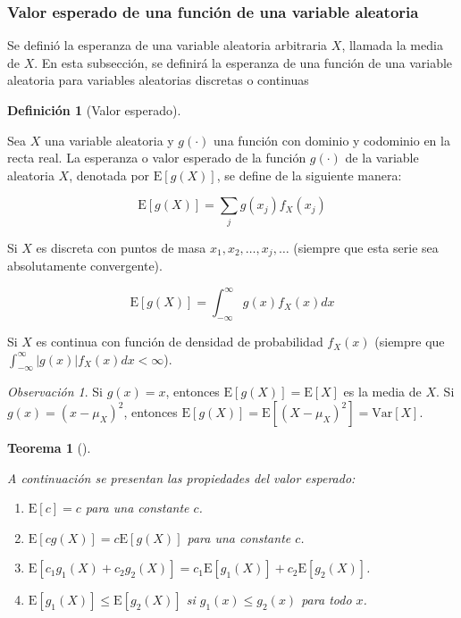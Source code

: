 \documentclass[
  letterpaper,
  DIV=11,
  numbers=noendperiod]{scrreport}
\theoremstyle{plain}
\newtheorem{theorem}{Teorema}[chapter]
\theoremstyle{definition}
\newtheorem{definition}{Definición}[chapter]
\theoremstyle{definition}
\theoremstyle{plain}
\theoremstyle{remark}
\newtheorem*{remark}{Observación}
\begin{document}
\subsubsection{Valor esperado de una función de una variable
aleatoria}\label{valor-esperado-de-una-funciuxf3n-de-una-variable-aleatoria}

Se definió la esperanza de una variable aleatoria arbitraria \(X\),
llamada la media de \(X\). En esta subsección, se definirá la esperanza
de una función de una variable aleatoria para variables aleatorias
discretas o continuas

\begin{definition}[Valor
esperado]\protect\hypertarget{def-VE}{}\label{def-VE}

Sea \(X\) una variable aleatoria y \(g(\cdot)\) una función con dominio
y codominio en la recta real. La esperanza o valor esperado de la
función \(g(\cdot)\) de la variable aleatoria \(X\), denotada por
\(\mathrm E[g(X)]\), se define de la siguiente manera:

\[ \mathrm E[g(X)]=\sum_j g(x_j)f_X(x_j) \]

Si \(X\) es discreta con puntos de masa
\(x_1, x_2, \ldots, x_j, \ldots\) (siempre que esta serie sea
absolutamente convergente).

\[ \mathrm E[g(X)]=\int_{-\infty}^\infty g(x)f_X(x)dx \]

Si \(X\) es continua con función de densidad de probabilidad \(f_X(x)\)
(siempre que \(\int_{-\infty}^\infty |g(x)|f_X(x)dx < \infty\)).

\end{definition}

\begin{remark}
Si \(g(x)=x\), entonces \(\mathrm E[g(X)]=\mathrm E[X]\) es la media de
\(X\). Si \(g(x)=(x-\mu_X)^2\), entonces
\(\mathrm E[g(X)]=\mathrm E[(X-\mu_X)^2]=\mathrm{Var}[X]\).
\end{remark}

\begin{theorem}[]\protect\hypertarget{thm-propve}{}\label{thm-propve}

A continuación se presentan las propiedades del valor esperado:

\begin{enumerate}
\def\labelenumi{\roman{enumi}.}
\item
  \(\mathrm E[c]=c\) para una constante \(c\).
\item
  \(\mathrm E[cg(X)]=c\mathrm E[g(X)]\) para una constante \(c\).
\item
  \(\mathrm E[c_1 g_1(X)+c_2 g_2(X)]=c_1\mathrm E[g_1(X)]+c_2\mathrm E[g_2(X)]\).
\item
  \(\mathrm E[g_1(X)]\leq \mathrm E[g_2(X)]\) si \(g_1(x)\leq g_2(x)\)
  para todo \(x\).
\end{enumerate}

\end{theorem}
\end{document}
